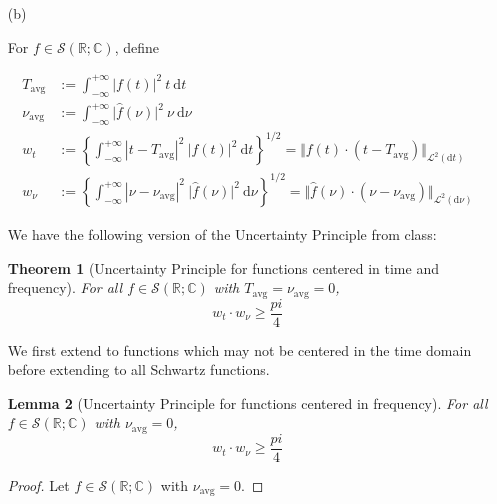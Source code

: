 \documentclass[12pt, reqno]{amsart}
\newtheorem{theorem}{Theorem}[section]
\newtheorem{lemma}[theorem]{Lemma}
\theoremstyle{definition}
\theoremstyle{remark}
\newcommand{\ud}{\mathrm{d}}
\begin{document}
\begin{itemize}
\vspace{0.1 cm}
\item[(b)] 

For $f\in\mathcal{S}(\mathbb{R;C})$, define 

\begin{align}
    T_{\mathrm{avg}} & := \int_{-\infty}^{+\infty} \vert f(t) \vert^2 ~t ~\ud t \\
    \nu_{\mathrm{avg}} &:= \int_{-\infty}^{+\infty} \vert \widehat{f}(\nu) \vert^2 ~\nu ~\ud \nu\\
    w_t &:= \left\{ \int_{-\infty}^{+\infty} \left\vert t - T_{\mathrm{avg}} \right\vert^2 ~\vert f(t) \vert^2 ~\ud t \right\}^{1/2} = \Vert  f(t) \cdot (t -T_{\mathrm{avg}}) \Vert_{\mathcal{L}^2(\ud t)}  \\
    w_\nu &:= \left\{ \int_{-\infty}^{+\infty} \left\vert \nu - \nu_{\mathrm{avg}} \right\vert^2 ~\vert \widehat{f}(\nu) \vert^2 ~\ud \nu \right\}^{1/2} = \Vert  \widehat{f}(\nu) \cdot (\nu -\nu_{\mathrm{avg}}) \Vert_{\mathcal{L}^2(\ud \nu)}
\end{align}

We have the following version of the Uncertainty Principle from class:

\begin{theorem}[Uncertainty Principle for functions centered in time and frequency]
    For all $f\in\mathcal{S}(\mathbb{R;C})$ with $T_{\mathrm{avg}}=\nu_{\mathrm{avg}}=0$, 
    \[
        w_t\cdot w_\nu\ge\frac{pi}{4}\]
\end{theorem}

We first extend to functions which may not be centered in the time domain before extending to all Schwartz functions.

\begin{lemma}[Uncertainty Principle for functions centered in frequency] \label{uncertainty_lemma}
    For all $f\in\mathcal{S}(\mathbb{R;C})$ with $\nu_{\mathrm{avg}}=0$, \[
        w_t\cdot w_\nu\ge\frac{pi}{4}\]
    
\end{lemma}

\begin{proof}
    Let $f\in\mathcal{S}(\mathbb{R};\mathbb{C})$ with $\nu_\text{avg}=0$.

\vspace*{10 pt}


\end{proof}
\end{itemize}
\end{document}
